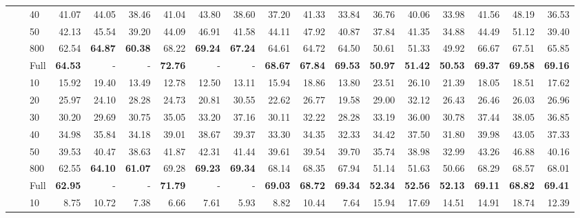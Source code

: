 \begin{table*}[!h]
{\begin{tabular}{lllrrr|rrr|rrr|rrr|rrr}
 \textbf{} & \textbf{} & 40 & 41.07 & 44.05 & 38.46 & 41.04 & 43.80 & 38.60 & 37.20 & 41.33 & 33.84 & 36.76 & 40.06 & 33.98 & 41.56 & 48.19 & 36.53 \\ 
 \textbf{} & \textbf{} & 50 & 42.13 & 45.54 & 39.20 & 44.09 & 46.91 & 41.58 & 44.11 & 47.92 & 40.87 & 37.84 & 41.35 & 34.88 & 44.49 & 51.12 & 39.40 \\ 
 \textbf{} & \textbf{} & 800 & 62.54 & \textbf{64.87} & \textbf{60.38} & 68.22 & \textbf{69.24} & \textbf{67.24} & 64.61 & 64.72 & 64.50 & 50.61 & 51.33 & 49.92 & 66.67 & 67.51 & 65.85 \\ 
 \textbf{} & \textbf{} & Full & \textbf{64.53} & - & - & \textbf{72.76} & - & - & \textbf{68.67} & \textbf{67.84} & \textbf{69.53} & \textbf{50.97} & \textbf{51.42} & \textbf{50.53} & \textbf{69.37} & \textbf{69.58} & \textbf{69.16} \\ 
\hline
\textbf{\multirow{7}{*}{DLO \citep{hu2022improving}}} & \textbf{} & 10 & 15.92 & 19.40 & 13.49 & 12.78 & 12.50 & 13.11 & 15.94 & 18.86 & 13.80 & 23.51 & 26.10 & 21.39 & 18.05 & 18.51 & 17.62 \\ 
 \textbf{} & \textbf{} & 20 & 25.97 & 24.10 & 28.28 & 24.73 & 20.81 & 30.55 & 22.62 & 26.77 & 19.58 & 29.00 & 32.12 & 26.43 & 26.46 & 26.03 & 26.96 \\ 
 \textbf{} & \textbf{} & 30 & 30.20 & 29.69 & 30.75 & 35.05 & 33.20 & 37.16 & 30.11 & 32.22 & 28.28 & 33.19 & 36.00 & 30.78 & 37.44 & 38.05 & 36.85 \\ 
 \textbf{} & \textbf{} & 40 & 34.98 & 35.84 & 34.18 & 39.01 & 38.67 & 39.37 & 33.30 & 34.35 & 32.33 & 34.42 & 37.50 & 31.80 & 39.98 & 43.05 & 37.33 \\ 
 \textbf{} & \textbf{} & 50 & 39.53 & 40.47 & 38.63 & 41.87 & 42.31 & 41.44 & 39.61 & 39.54 & 39.70 & 35.74 & 38.98 & 32.99 & 43.26 & 46.88 & 40.16 \\ 
 \textbf{} & \textbf{} & 800 & 62.55 & \textbf{64.10} & \textbf{61.07} & 69.28 & \textbf{69.23} & \textbf{69.34} & 68.14 & 68.35 & 67.94 & 51.14 & 51.63 & 50.66 & 68.29 & 68.57 & 68.01 \\ 
 \textbf{} & \textbf{} & Full & \textbf{62.95} & - & - & \textbf{71.79} & - & - & \textbf{69.03} & \textbf{68.72} & \textbf{69.34} & \textbf{52.34} & \textbf{52.56} & \textbf{52.13} & \textbf{69.11} & \textbf{68.82} & \textbf{69.41} \\ 
\hline
\textbf{\multirow{7}{*}{Paraphrase \citep{zhang2021aspect}}} & \textbf{} & 10 & 8.75 & 10.72 & 7.38 & 6.66 & 7.61 & 5.93 & 8.82 & 10.44 & 7.64 & 15.94 & 17.69 & 14.51 & 14.91 & 18.74 & 12.39 \\ 

\end{tabular}}
\end{table*}
